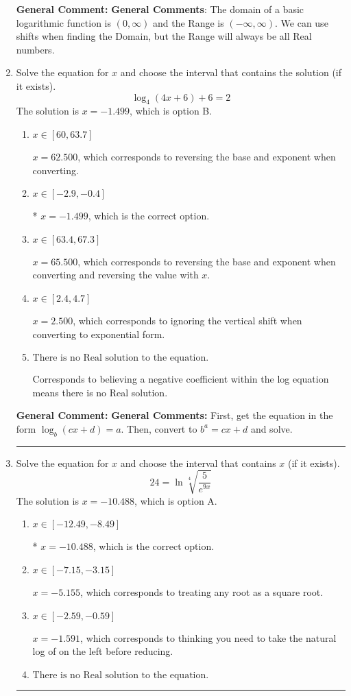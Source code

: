 \documentclass{extbook}[14pt]
\newcommand{\litem}[1]{\item #1

\rule{\textwidth}{0.4pt}}
\begin{document}
\begin{enumerate}
{\textbf{General Comment:} \textbf{General Comments}: The domain of a basic logarithmic function is $(0, \infty)$ and the Range is $(-\infty, \infty)$. We can use shifts when finding the Domain, but the Range will always be all Real numbers.
}
\litem{
Solve the equation for $x$ and choose the interval that contains the solution (if it exists).
\[ \log_{4}{(4x+6)}+6 = 2 \]The solution is \( x = -1.499 \), which is option B.\begin{enumerate}[label=\Alph*.]
\item \( x \in [60, 63.7] \)

$x = 62.500$, which corresponds to reversing the base and exponent when converting.
\item \( x \in [-2.9, -0.4] \)

* $x = -1.499$, which is the correct option.
\item \( x \in [63.4, 67.3] \)

$x = 65.500$, which corresponds to reversing the base and exponent when converting and reversing the value with $x$.
\item \( x \in [2.4, 4.7] \)

$x = 2.500$, which corresponds to ignoring the vertical shift when converting to exponential form.
\item \( \text{There is no Real solution to the equation.} \)

Corresponds to believing a negative coefficient within the log equation means there is no Real solution.
\end{enumerate}

\textbf{General Comment:} \textbf{General Comments:} First, get the equation in the form $\log_b{(cx+d)} = a$. Then, convert to $b^a = cx+d$ and solve.
}
\litem{
 Solve the equation for $x$ and choose the interval that contains $x$ (if it exists).
\[  24 = \ln{\sqrt[4]{\frac{5}{e^{9x}}}} \]The solution is \( x = -10.488 \), which is option A.\begin{enumerate}[label=\Alph*.]
\item \( x \in [-12.49, -8.49] \)

* $x = -10.488$, which is the correct option.
\item \( x \in [-7.15, -3.15] \)

$x = -5.155$, which corresponds to treating any root as a square root.
\item \( x \in [-2.59, -0.59] \)

$x = -1.591$, which corresponds to thinking you need to take the natural log of on the left before reducing.
\item \( \text{There is no Real solution to the equation.} \)


\end{enumerate}}
\end{enumerate}
\end{document}
